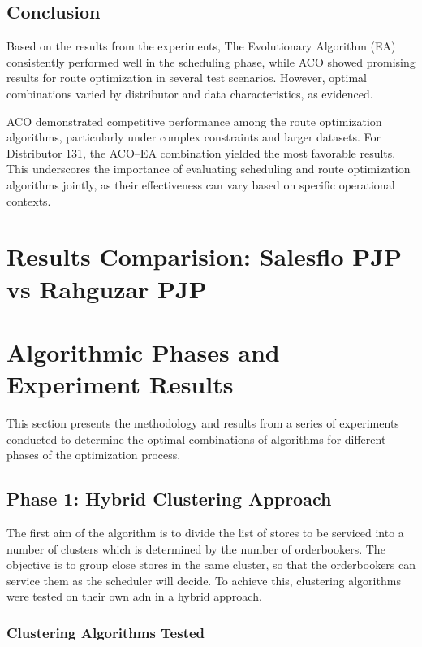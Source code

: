 \subsection{Conclusion}
Based on the results from the experiments, The Evolutionary Algorithm (EA) consistently performed well in the scheduling phase, while ACO showed promising results for route optimization in several test scenarios. However, optimal combinations varied by distributor and data characteristics, as evidenced.

ACO demonstrated competitive performance among the route optimization algorithms, particularly under complex constraints and larger datasets. For Distributor 131, the ACO–EA combination yielded the most favorable results. This underscores the importance of evaluating scheduling and route optimization algorithms jointly, as their effectiveness can vary based on specific operational contexts.


\section{Results Comparision: Salesflo PJP vs Rahguzar PJP}

\section{Algorithmic Phases and Experiment Results}

This section presents the methodology and results from a series of experiments conducted to determine the optimal combinations of algorithms for different phases of the optimization process.




\subsection{Phase 1: Hybrid Clustering Approach}
The first aim of the algorithm is to divide the list of stores to be serviced into a number of clusters which is determined by the number of orderbookers.
The objective is to group close stores in the same cluster, so that the orderbookers can service them as the scheduler will decide.
To achieve this, clustering algorithms were tested on their own adn in a hybrid approach.

\subsubsection{Clustering Algorithms Tested}

